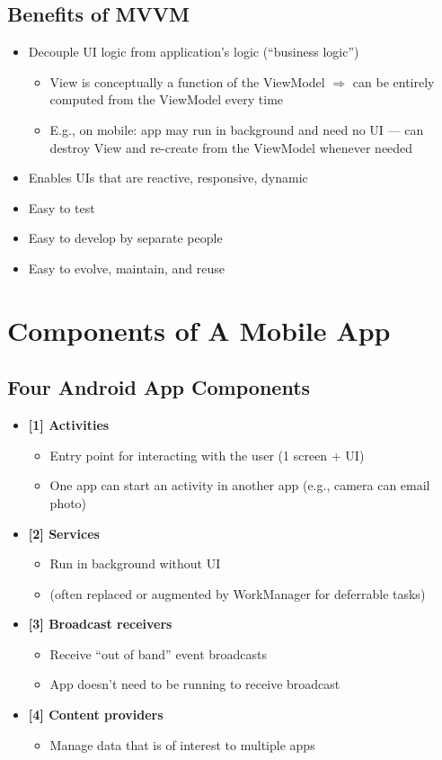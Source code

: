 \subsection{Benefits of MVVM}

\begin{itemize}
  \item Decouple UI logic from application's logic (``business logic'')
  \begin{itemize}
    \item View is conceptually a function of the ViewModel $\Rightarrow$ can be entirely computed from the ViewModel every time
    \item E.g., on mobile: app may run in background and need no UI --- can destroy View and re-create from the ViewModel whenever needed
  \end{itemize}
  \item Enables UIs that are reactive, responsive, dynamic
  \item Easy to test
  \item Easy to develop by separate people
  \item Easy to evolve, maintain, and reuse
\end{itemize}

\section{Components of A Mobile App}

\subsection{Four Android App Components}

\begin{itemize}
  \item \textbf{[1] Activities}
  \begin{itemize}
    \item Entry point for interacting with the user (1 screen + UI)
    \item One app can start an activity in another app (e.g., camera can email photo)
  \end{itemize}
  \item \textbf{[2] Services}
  \begin{itemize}
    \item Run in background without UI
    \item (often replaced or augmented by WorkManager for deferrable tasks)
  \end{itemize}
  \item \textbf{[3] Broadcast receivers}
  \begin{itemize}
    \item Receive ``out of band'' event broadcasts
    \item App doesn't need to be running to receive broadcast
  \end{itemize}
  \item \textbf{[4] Content providers}
  \begin{itemize}
    \item Manage data that is of interest to multiple apps
  \end{itemize}
\end{itemize}

